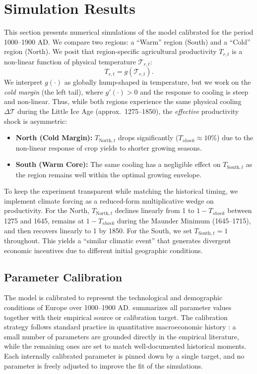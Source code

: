 \documentclass[11pt,a4paper]{article}
\begin{document}
\section{Simulation Results}
This section presents numerical simulations of the model calibrated for the period 1000--1900 AD. We compare two regions: a ``Warm'' region (South) and a ``Cold'' region (North). We posit that region-specific agricultural productivity \(T_{r,t}\) is a non-linear function of physical temperature \(\mathcal{T}_{r,t}\):
\begin{equation}
  T_{r,t} = g(\mathcal{T}_{r,t}).
\end{equation}
We interpret \(g(\cdot)\) as globally hump-shaped in temperature, but we work on the \textit{cold margin} (the left tail), where \(g'(\cdot)>0\) and the response to cooling is steep and non-linear. Thus, while both regions experience the same physical cooling \(\Delta \mathcal{T}\) during the Little Ice Age (approx.\ 1275--1850), the \textit{effective} productivity shock is asymmetric:
\begin{itemize}
  \item \textbf{North (Cold Margin):} \(T_{\text{North},t}\) drops significantly (\(T_{shock} \approx 10\%\)) due to the non-linear response of crop yields to shorter growing seasons.
  \item \textbf{South (Warm Core):} The same cooling has a negligible effect on \(T_{\text{South},t}\) as the region remains well within the optimal growing envelope.
\end{itemize}
To keep the experiment transparent while matching the historical timing, we implement climate forcing as a reduced-form multiplicative wedge on productivity. For the North, \(T_{\text{North},t}\) declines linearly from 1 to \(1-T_{shock}\) between 1275 and 1645, remains at \(1-T_{shock}\) during the Maunder Minimum (1645--1715), and then recovers linearly to 1 by 1850. For the South, we set \(T_{\text{South},t}=1\) throughout. This yields a ``similar climatic event'' that generates divergent economic incentives due to different initial geographic conditions.

\subsection*{Parameter Calibration}
\label{sec:calibration}

The model is calibrated to represent the technological and demographic conditions of Europe over 1000--1900 AD.  summarizes all parameter values together with their empirical source or calibration target. The calibration strategy follows standard practice in quantitative macroeconomic history \parencite{Lagerlof2006, GalorWeil2000}: a small number of parameters are grounded directly in the empirical literature, while the remaining ones are set to match well-documented historical moments. Each internally calibrated parameter is pinned down by a single target, and no parameter is freely adjusted to improve the fit of the simulations.
\end{document}
